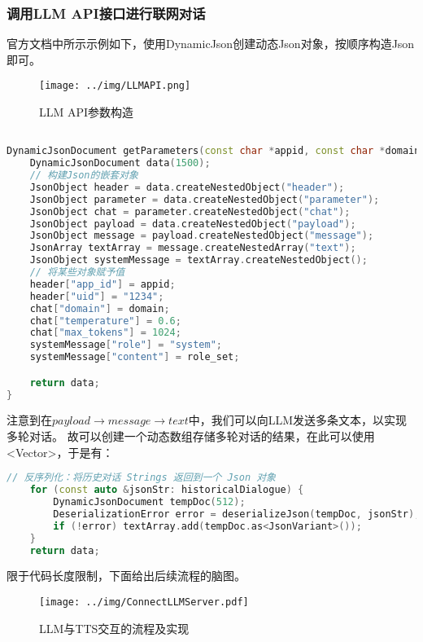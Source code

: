 \subsubsection{调用LLM API接口进行联网对话}

官方文档中所示示例如下，使用DynamicJson创建动态Json对象，按顺序构造Json即可。

\begin{figure} [H]
    \centering
    \texttt{[image: ../img/LLMAPI.png]}
    \caption{LLM API参数构造}
    \label{fig:LLMAPI}
\end{figure}

\begin{lstlisting}[language = C++, title = {调用LLM API接口进行联网对话}]

DynamicJsonDocument getParameters(const char *appid, const char *domain, const char *role_set) {
    DynamicJsonDocument data(1500);
    // 构建Json的嵌套对象
    JsonObject header = data.createNestedObject("header");
    JsonObject parameter = data.createNestedObject("parameter");
    JsonObject chat = parameter.createNestedObject("chat");
    JsonObject payload = data.createNestedObject("payload");
    JsonObject message = payload.createNestedObject("message");
    JsonArray textArray = message.createNestedArray("text");
    JsonObject systemMessage = textArray.createNestedObject();
    // 将某些对象赋予值
    header["app_id"] = appid;
    header["uid"] = "1234";
    chat["domain"] = domain;
    chat["temperature"] = 0.6;
    chat["max_tokens"] = 1024;
    systemMessage["role"] = "system";
    systemMessage["content"] = role_set;

    return data;
}
\end{lstlisting}

注意到在$payload \rightarrow message \rightarrow text$中，我们可以向LLM发送多条文本，以实现多轮对话。
故可以创建一个动态数组存储多轮对话的结果，在此可以使用<Vector>，于是有：

\begin{lstlisting}[language = C++, title = {多轮对话实现}]
    // 反序列化：将历史对话 Strings 返回到一个 Json 对象
    for (const auto &jsonStr: historicalDialogue) {
        DynamicJsonDocument tempDoc(512);
        DeserializationError error = deserializeJson(tempDoc, jsonStr);
        if (!error) textArray.add(tempDoc.as<JsonVariant>());
    }
    return data;
\end{lstlisting}

限于代码长度限制，下面给出后续流程的脑图。

\begin{figure} [H]
    \centering
    \texttt{[image: ../img/ConnectLLMServer.pdf]}
    \caption{LLM与TTS交互的流程及实现}
    \label{fig:ConnectLLMServer}
\end{figure}